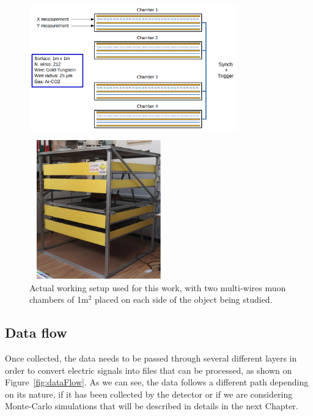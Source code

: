 \documentclass[a4paper, 11pt, twoside, openright]{report}
\begin{document}
\begin{figure}[htbp]
\centering
\begin{minipage}[b]{.59\textwidth}
\includegraphics[width=9cm, height=6cm]{figs/muonChambers.png}
\end{minipage}\hfill
\begin{minipage}[b]{.39\textwidth}
\includegraphics[width=6cm, height=6cm]{figs/muonChambersPhoto.png}
\end{minipage} \hfill
\caption{Actual working setup used for this work, with two multi-wires muon chambers of 1m$^2$ placed on each side of the object being studied.}
\label{fig:setup}
\end{figure}

\subsection{Data flow} \label{sec:dataFlow}

Once collected, the data needs to be passed through several different layers in order to convert electric signals into files that can be processed, as shown on Figure~\ref{fig:dataFlow}. As we can see, the data follows a different path depending on its nature, if it has been collected by the detector or if we are considering Monte-Carlo simulations that will be described in details in the next Chapter. 
\end{document}
